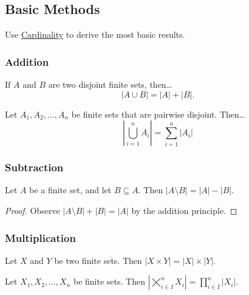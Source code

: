 \subsection{Basic Methods}\label{basiccombinatorics}

Use \hyperref[cardinalnumbers]{Cardinality} to derive the most basic results.

\subsubsection{Addition}\label{addition}

\begin{theorem}
If $A$ and $B$ are two disjoint finite sets, then\dots
$$|A \cup B| = |A| + |B|.$$
\end{theorem}

\begin{theorem}
Let $A_1,A_2,\dots,A_n$ be finite sets that are pairwise disjoint. Then\dots
$$|\bigcup_{i=1}^nA_i| = \sum_{i=1}^n |A_i|$$
\end{theorem}

\subsubsection{Subtraction}\label{subtraction}

\begin{theorem}
Let $A$ be a finite set, and let $B \subseteq A$. Then $|A \setminus B|=|A|-|B|$.
\end{theorem}

\begin{proof}
Observe $|A \setminus B|+|B| = |A|$ by the addition principle.
\end{proof}

\subsubsection{Multiplication}\label{multiplication}

\begin{theorem} 
Let $X$ and $Y$ be two finite sets. Then $|X \times Y| = |X| \times |Y|$.
\end{theorem}

\begin{theorem}
Let $X_1,X_2,\dots,X_n$ be finite sets. Then $|\bigtimes_{i \in I}^{n} X_i| = \prod_{i \in I}^{n} |X_i|$.
\end{theorem}

